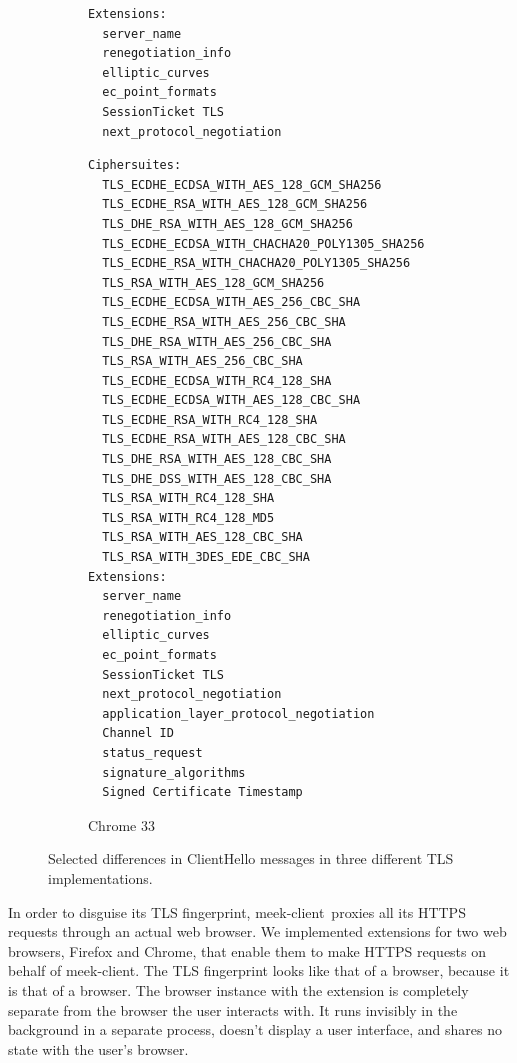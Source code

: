 \documentclass[conference]{IEEEtran}
\def\meekclient{\mbox{meek-client}}
\begin{document}
\begin{figure}
\begin{subfigure}[t]{0.30\textwidth}
\begin{minipage}[t][57ex][t]{\textwidth}
\begin{verbatim}
Extensions:
  server_name
  renegotiation_info
  elliptic_curves
  ec_point_formats
  SessionTicket TLS
  next_protocol_negotiation
\end{verbatim}
\end{minipage}
\label{fig:ciphersuites:firefox}
\end{subfigure}
%
\begin{subfigure}[t]{0.30\textwidth}
\caption{Chrome 33}
\begin{minipage}[t][42.5ex][t]{\textwidth}
\tiny
\begin{verbatim}
Ciphersuites:
  TLS_ECDHE_ECDSA_WITH_AES_128_GCM_SHA256
  TLS_ECDHE_RSA_WITH_AES_128_GCM_SHA256
  TLS_DHE_RSA_WITH_AES_128_GCM_SHA256
  TLS_ECDHE_ECDSA_WITH_CHACHA20_POLY1305_SHA256
  TLS_ECDHE_RSA_WITH_CHACHA20_POLY1305_SHA256
  TLS_RSA_WITH_AES_128_GCM_SHA256
  TLS_ECDHE_ECDSA_WITH_AES_256_CBC_SHA
  TLS_ECDHE_RSA_WITH_AES_256_CBC_SHA
  TLS_DHE_RSA_WITH_AES_256_CBC_SHA
  TLS_RSA_WITH_AES_256_CBC_SHA
  TLS_ECDHE_ECDSA_WITH_RC4_128_SHA
  TLS_ECDHE_ECDSA_WITH_AES_128_CBC_SHA
  TLS_ECDHE_RSA_WITH_RC4_128_SHA
  TLS_ECDHE_RSA_WITH_AES_128_CBC_SHA
  TLS_DHE_RSA_WITH_AES_128_CBC_SHA
  TLS_DHE_DSS_WITH_AES_128_CBC_SHA
  TLS_RSA_WITH_RC4_128_SHA
  TLS_RSA_WITH_RC4_128_MD5
  TLS_RSA_WITH_AES_128_CBC_SHA
  TLS_RSA_WITH_3DES_EDE_CBC_SHA
Extensions:
  server_name
  renegotiation_info
  elliptic_curves
  ec_point_formats
  SessionTicket TLS
  next_protocol_negotiation
  application_layer_protocol_negotiation
  Channel ID
  status_request
  signature_algorithms
  Signed Certificate Timestamp
\end{verbatim}
\end{minipage}
\label{fig:ciphersuites:chrome}
\end{subfigure}

\caption{
Selected differences in ClientHello messages in three different TLS implementations.
}
\label{fig:ciphersuites}
\end{figure}

In order to disguise its TLS fingerprint,
\meekclient\ proxies all its HTTPS requests through an actual web browser.
We implemented extensions for two web browsers,
Firefox and Chrome,
that enable them to make HTTPS requests on behalf of \meekclient.
The TLS fingerprint looks like that of a browser, because it is that of a browser.
The browser instance with the extension is completely separate
from the browser the user interacts with.
It runs invisibly in the background in a separate process,
doesn't display a user interface,
and shares no state with the user's browser.
\end{document}
